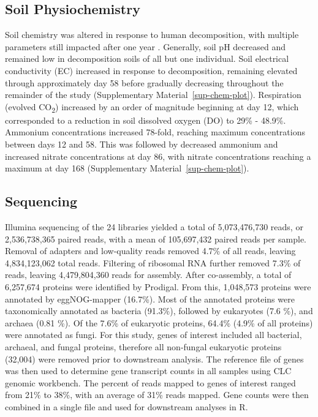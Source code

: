 \documentclass[
  sn-nature,
  lineno, referee]{sn-jnl}
\begin{document}
\subsection{Soil Physiochemistry}\label{soil-physiochemistry}

Soil chemistry was altered in response to human decomposition, with
multiple parameters still impacted after one year
\citep{taylor_transient_2024}. Generally, soil pH decreased and remained
low in decomposition soils of all but one individual. Soil electrical
conductivity (EC) increased in response to decomposition, remaining
elevated through approximately day 58 before gradually decreasing
throughout the remainder of the study
(Supplementary Material~\ref{sup-chem-plot}). Respiration (evolved
CO\textsubscript{2}) increased by an order of magnitude beginning at day
12, which corresponded to a reduction in soil dissolved oxygen (DO) to
29\% - 48.9\%. Ammonium concentrations increased 78-fold, reaching
maximum concentrations between days 12 and 58. This was followed by
decreased ammonium and increased nitrate concentrations at day 86, with
nitrate concentrations reaching a maximum at day 168
(Supplementary Material~\ref{sup-chem-plot}).

\subsection{Sequencing}\label{sequencing}

Illumina sequencing of the 24 libraries yielded a total of 5,073,476,730
reads, or 2,536,738,365 paired reads, with a mean of 105,697,432 paired
reads per sample. Removal of adapters and low-quality reads removed
4.7\% of all reads, leaving 4,834,123,062 total reads. Filtering of
ribosomal RNA further removed 7.3\% of reads, leaving 4,479,804,360
reads for assembly. After co-assembly, a total of 6,257,674 proteins
were identified by Prodigal. From this, 1,048,573 proteins were
annotated by eggNOG-mapper (16.7\%). Most of the annotated proteins were
taxonomically annotated as bacteria (91.3\%), followed by eukaryotes
(7.6 \%), and archaea (0.81 \%). Of the 7.6\% of eukaryotic proteins,
64.4\% (4.9\% of all proteins) were annotated as fungi. For this study,
genes of interest included all bacterial, archaeal, and fungal proteins,
therefore all non-fungal eukaryotic proteins (32,004) were removed prior
to downstream analysis. The reference file of genes was then used to
determine gene transcript counts in all samples using CLC genomic
workbench. The percent of reads mapped to genes of interest ranged from
21\% to 38\%, with an average of 31\% reads mapped. Gene counts were
then combined in a single file and used for downstream analyses in R.
\end{document}
